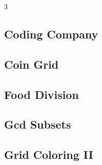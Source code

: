 \documentclass[8pt]{extarticle}
\begin{document}
\begin{multicols*}{3}
\subsection{Coding Company}
\begin{caixaenunciado}

\end{caixaenunciado}
\vspace{0.3cm}


\subsection{Coin Grid}
\begin{caixaenunciado}

\end{caixaenunciado}
\vspace{0.3cm}


\subsection{Food Division}
\begin{caixaenunciado}

\end{caixaenunciado}
\vspace{0.3cm}


\subsection{Gcd Subsets}
\begin{caixaenunciado}

\end{caixaenunciado}
\vspace{0.3cm}


\subsection{Grid Coloring II}
\begin{caixaenunciado}

\end{caixaenunciado}
\vspace{0.3cm}



\end{multicols*}
\end{document}
